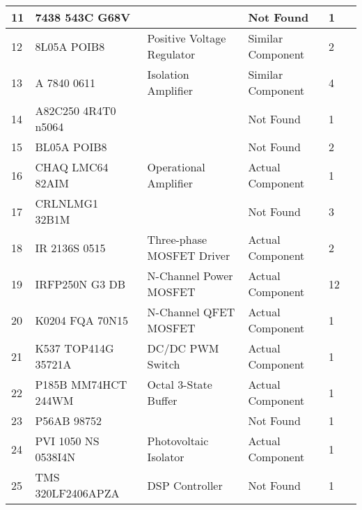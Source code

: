 \documentclass[]{formalLabReport}
\begin{document}
\begin{center}
\begin{table}[]
\begin{tabular}{|l|l|l|l|l|l|}
    11               & 7438 543C G68V                           &                                            & Not Found               & 1        \\ \hline
    12               & 8L05A POIB8                              & Positive Voltage Regulator                 & Similar Component       & 2        \\ \hline
    13               & A 7840 0611                              & Isolation Amplifier                        & Similar Component       & 4        \\ \hline
    14               & A82C250 4R4T0 n5064                      &                                            & Not Found               & 1        \\ \hline
    15               & BL05A POIB8                              &                                            & Not Found               & 2        \\ \hline
    16               & CHAQ LMC64 82AIM                         & Operational Amplifier & Actual Component        & 1        \\ \hline
    17               & CRLNLMG1 32B1M                           &                                            & Not Found             & 3        \\ \hline
    18               & IR 2136S 0515                            & Three-phase MOSFET Driver             & Actual Component        & 2        \\ \hline
    19               & IRFP250N G3 DB                           & N-Channel Power MOSFET                     & Actual Component        & 12       \\ \hline
    20               & K0204 FQA 70N15                          & N-Channel QFET MOSFET                      & Actual Component        & 1        \\ \hline
    21               & K537 TOP414G 35721A                      & DC/DC PWM Switch                           & Actual Component        & 1        \\ \hline
    22               & P185B MM74HCT 244WM                      & Octal 3-State Buffer                       & Actual Component        & 1        \\ \hline
    23               & P56AB 98752                              &                                            & Not Found               & 1        \\ \hline
    24               & PVI 1050 NS 0538I4N                      & Photovoltaic Isolator          & Actual Component       & 1        \\ \hline
    25               & TMS 320LF2406APZA        & DSP Controller                             & Not Found              & 1        \\ \hline
    \end{tabular}
    \end{table}
\end{center}
\end{document}
